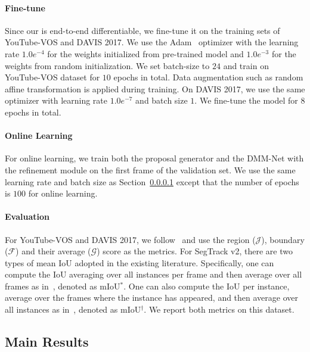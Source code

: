 \paragraph{Fine-tune}\label{para:ft}
Since our {\ourmodelshort} is end-to-end differentiable, we fine-tune it on the training sets of YouTube-VOS and DAVIS 2017.
We use the Adam~\cite{kingma2014adam} optimizer with the learning rate $1.0e^{-4}$ for the weights initialized from pre-trained model and $1.0e^{-3}$ for the weights from random initialization. 
We set batch-size to $24$ and train on YouTube-VOS dataset for $10$ epochs in total. 
Data augmentation such as random affine transformation is applied during training. 
On DAVIS 2017, we use the same optimizer with learning rate $1.0e^{-7}$ and batch size $1$. We fine-tune the model for $8$ epochs in total.


\paragraph{Online Learning}
For online learning, we train both the proposal generator and the DMM-Net with the refinement module on the first frame of the validation set. We use the same learning rate and batch size as  Section~\ref{para:ft} except that the number of epochs is $100$ for online learning. 

\paragraph{Evaluation}
For YouTube-VOS and DAVIS 2017, we follow~\cite{pont2017} and use the region ($\mathcal{J}$), boundary ($\mathcal{F}$) and their average ($\mathcal{G}$) score as the metrics.
For SegTrack v2, there are two types of mean IoU adopted in the existing literature. 
Specifically, one can compute the IoU averaging over all instances per frame and then average over all frames as in~\cite{hu2017maskrnn}, denoted as mIoU$^{\ast}$.
One can also compute the IoU per instance, average over the frames where the instance has appeared, and then average over all instances as in~\cite{li2018video}, denoted as mIoU$^{\dagger}$. 
We report both metrics on this dataset.

\subsection{Main Results}



